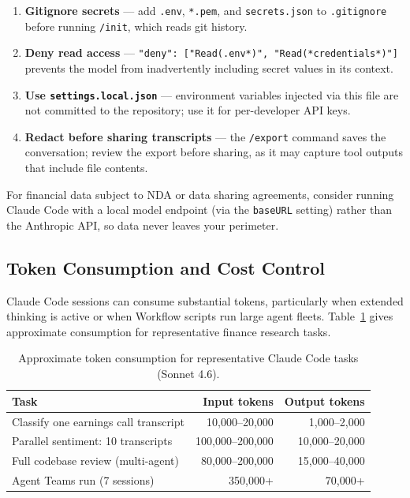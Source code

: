 \begin{enumerate}
  \item \textbf{Gitignore secrets} --- add \texttt{.env}, \texttt{*.pem},
        and \texttt{secrets.json} to \texttt{.gitignore} before running
        \texttt{/init}, which reads git history.
  \item \textbf{Deny read access} ---
        \texttt{"deny": ["Read(.env*)", "Read(*credentials*)"]} prevents
        the model from inadvertently including secret values in its context.
  \item \textbf{Use \texttt{settings.local.json}} --- environment variables
        injected via this file are not committed to the repository; use it
        for per-developer API keys.
  \item \textbf{Redact before sharing transcripts} --- the \texttt{/export}
        command saves the conversation; review the export before sharing, as
        it may capture tool outputs that include file contents.
\end{enumerate}

For financial data subject to NDA or data sharing agreements, consider running
Claude Code with a local model endpoint (via the \texttt{baseURL} setting)
rather than the Anthropic API, so data never leaves your perimeter.

\subsection{Token Consumption and Cost Control}
\label{app:claude-code:cost}

Claude Code sessions can consume substantial tokens, particularly when extended
thinking is active or when Workflow scripts run large agent fleets.
Table~\ref{tab:token-costs} gives approximate consumption for representative
finance research tasks.

\begin{table}[ht]
\centering
\caption{Approximate token consumption for representative Claude Code tasks (Sonnet 4.6).}
\label{tab:token-costs}
\begin{tabular}{lrr}
\toprule
\textbf{Task} & \textbf{Input tokens} & \textbf{Output tokens} \\
\midrule
Classify one earnings call transcript   & 10{,}000--20{,}000  & 1{,}000--2{,}000 \\
Parallel sentiment: 10 transcripts      & 100{,}000--200{,}000 & 10{,}000--20{,}000 \\
Full codebase review (multi-agent)      & 80{,}000--200{,}000 & 15{,}000--40{,}000 \\
Agent Teams run (7 sessions)            & 350{,}000+          & 70{,}000+ \\
\bottomrule
\end{tabular}
\end{table}

